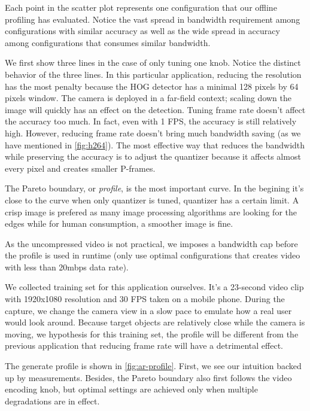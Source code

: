 Each point in the scatter plot represents one configuration that our offline
profiling has evaluated. Notice the vast spread in bandwidth requirement among
configurations with similar accuracy as well as the wide spread in accuracy
among configurations that consumes similar bandwidth.

We first show three lines in the case of only tuning one knob. Notice the
distinct behavior of the three lines. In this particular application, reducing
the resolution has the most penalty because the HOG detector has a minimal 128
pixels by 64 pixels window. The camera is deployed in a far-field context;
scaling down the image will quickly has an effect on the detection. Tuning frame
rate doesn't affect the accuracy too much. In fact, even with 1 FPS, the
accuracy is still relatively high. However, reducing frame rate doesn't bring
much bandwidth saving (as we have mentioned in \autoref{fig:h264}).  The most
effective way that reduces the bandwidth while preserving the accuracy is to
adjust the quantizer because it affects almost every pixel and creates smaller
P-frames.

The Pareto boundary, or \textit{profile}, is the most important curve. In the
begining it's close to the curve when only quantizer is tuned, quantizer has a
certain limit. A crisp image is prefered as many image processing algorithms are
looking for the edges while for human consumption, a smoother image is fine.

As the uncompressed video is not practical, we imposes a bandwidth cap before
the profile is used in runtime (only use optimal configurations that creates
video with less than 20mbps data rate).

 We collected training set for this application
ourselves. It's a 23-second video clip with 1920x1080 resolution and 30 FPS
taken on a mobile phone. During the capture, we change the camera view in a slow
pace to emulate how a real user would look around. Because target objects are
relatively close while the camera is moving, we hypothesis for this training
set, the profile will be different from the previous application that reducing
frame rate will have a detrimental effect.

The generate profile is shown in \autoref{fig:ar-profile}. First, we see our
intuition backed up by measurements. Besides, the Pareto boundary also first
follows the video encoding knob, but optimal settings are achieved only when
multiple degradations are in effect.

